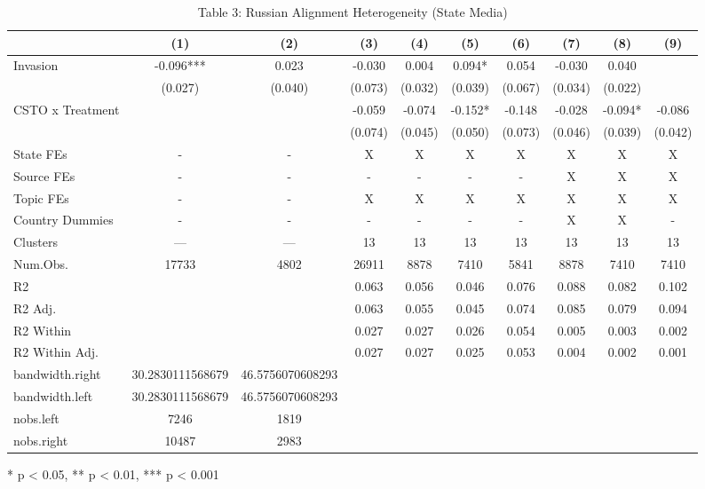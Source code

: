 \begin{table}[!t]
\caption{Table 3: Russian Alignment Heterogeneity (State Media)} 
\fontsize{12.0pt}{14.4pt}\selectfont
\begin{tabular*}{\linewidth}{@{\extracolsep{\fill}}lccccccccc}
\toprule
  & (1) & (2) & (3) & (4) & (5) & (6) & (7) & (8) & (9) \\ 
\midrule\addlinespace[2.5pt]
Invasion & -0.096*** & 0.023 & -0.030 & 0.004 & 0.094* & 0.054 & -0.030 & 0.040 &  \\ 
 & (0.027) & (0.040) & (0.073) & (0.032) & (0.039) & (0.067) & (0.034) & (0.022) &  \\ 
CSTO x Treatment &  &  & -0.059 & -0.074 & -0.152* & -0.148 & -0.028 & -0.094* & -0.086 \\ 
{} & {} & {} & {(0.074)} & {(0.045)} & {(0.050)} & {(0.073)} & {(0.046)} & {(0.039)} & {(0.042)} \\ 
State FEs & - & - & X & X & X & X & X & X & X \\ 
Source FEs & - & - & - & - & - & - & X & X & X \\ 
Topic FEs & - & - & X & X & X & X & X & X & X \\ 
Country Dummies & - & - & - & - & - & - & X & X & - \\ 
Clusters & — & — & 13 & 13 & 13 & 13 & 13 & 13 & 13 \\ 
Num.Obs. & 17733 & 4802 & 26911 & 8878 & 7410 & 5841 & 8878 & 7410 & 7410 \\ 
R2 &  &  & 0.063 & 0.056 & 0.046 & 0.076 & 0.088 & 0.082 & 0.102 \\ 
R2 Adj. &  &  & 0.063 & 0.055 & 0.045 & 0.074 & 0.085 & 0.079 & 0.094 \\ 
R2 Within &  &  & 0.027 & 0.027 & 0.026 & 0.054 & 0.005 & 0.003 & 0.002 \\ 
R2 Within Adj. &  &  & 0.027 & 0.027 & 0.025 & 0.053 & 0.004 & 0.002 & 0.001 \\ 
bandwidth.right & 30.2830111568679 & 46.5756070608293 &  &  &  &  &  &  &  \\ 
bandwidth.left & 30.2830111568679 & 46.5756070608293 &  &  &  &  &  &  &  \\ 
nobs.left & 7246 & 1819 &  &  &  &  &  &  &  \\ 
nobs.right & 10487 & 2983 &  &  &  &  &  &  &  \\ 
\bottomrule
\end{tabular*}
\begin{minipage}{\linewidth}
* p < 0.05, ** p < 0.01, *** p < 0.001\\

\end{minipage}
\end{table}
